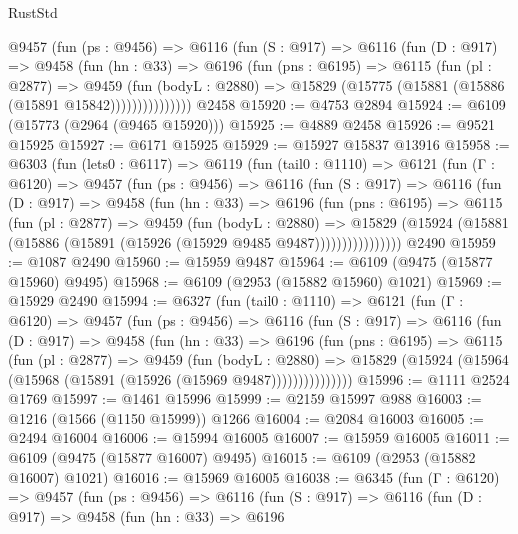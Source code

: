 \begin{lexlean}{RustStd}
\begin{coremodule}
          @9457
            (fun (ps : @9456) =>
            @6116
              (fun (S : @917) =>
              @6116
                (fun (D : @917) =>
                @9458
                  (fun (hn : @33) =>
                  @6196
                    (fun (pns : @6195) =>
                    @6115
                      (fun (pl : @2877) =>
                      @9459
                        (fun (bodyL : @2880) =>
                        @15829 (@15775 (@15881 (@15886 (@15891 @15842)))))))))))))))
    @2458
@15920 := @4753 @2894
@15924 := @6109 (@15773 (@2964 (@9465 @15920)))
@15925 := @4889 @2458
@15926 := @9521 @15925
@15927 := @6171 @15925
@15929 := @15927 @15837 @13916
@15958 := @6303
    (fun (lets0 : @6117) =>
    @6119
      (fun (tail0 : @1110) =>
      @6121
        (fun (Γ : @6120) =>
        @9457
          (fun (ps : @9456) =>
          @6116
            (fun (S : @917) =>
            @6116
              (fun (D : @917) =>
              @9458
                (fun (hn : @33) =>
                @6196
                  (fun (pns : @6195) =>
                  @6115
                    (fun (pl : @2877) =>
                    @9459
                      (fun (bodyL : @2880) =>
                      @15829
                        (@15924 (@15881 (@15886 (@15891 (@15926 (@15929 @9485 @9487))))))))))))))))
    @2490
@15959 := @1087 @2490
@15960 := @15959 @9487
@15964 := @6109 (@9475 (@15877 @15960) @9495)
@15968 := @6109 (@2953 (@15882 @15960) @1021)
@15969 := @15929 @2490
@15994 := @6327
    (fun (tail0 : @1110) =>
    @6121
      (fun (Γ : @6120) =>
      @9457
        (fun (ps : @9456) =>
        @6116
          (fun (S : @917) =>
          @6116
            (fun (D : @917) =>
            @9458
              (fun (hn : @33) =>
              @6196
                (fun (pns : @6195) =>
                @6115
                  (fun (pl : @2877) =>
                  @9459
                    (fun (bodyL : @2880) =>
                    @15829 (@15924 (@15964 (@15968 (@15891 (@15926 (@15969 @9487)))))))))))))))
@15996 := @1111 @2524 @1769
@15997 := @1461 @15996
@15999 := @2159 @15997 @988
@16003 := @1216 (@1566 (@1150 @15999)) @1266
@16004 := @2084 @16003
@16005 := @2494 @16004
@16006 := @15994 @16005
@16007 := @15959 @16005
@16011 := @6109 (@9475 (@15877 @16007) @9495)
@16015 := @6109 (@2953 (@15882 @16007) @1021)
@16016 := @15969 @16005
@16038 := @6345
    (fun (Γ : @6120) =>
    @9457
      (fun (ps : @9456) =>
      @6116
        (fun (S : @917) =>
        @6116
          (fun (D : @917) =>
          @9458
            (fun (hn : @33) =>
            @6196

\end{coremodule}
\end{lexlean}
